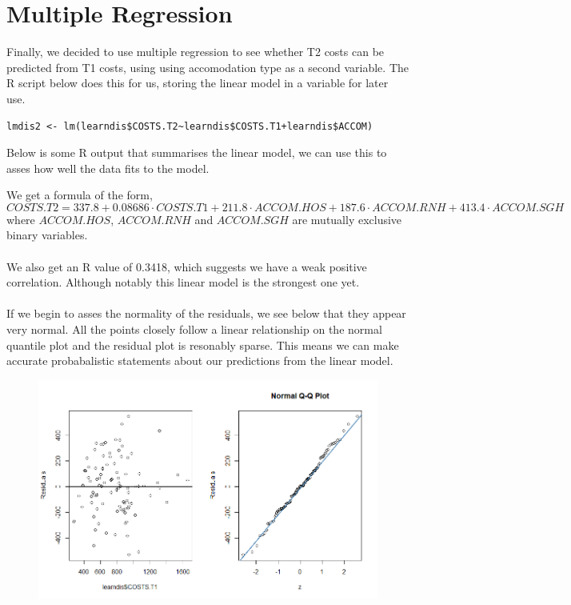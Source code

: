 \documentclass[]{article}
\begin{document}
\section{Multiple Regression}
Finally, we decided to use multiple regression to see whether T2 costs can be predicted from T1 costs, using using accomodation type as a second variable. The R script below does this for us, storing the linear model in a variable for later use.
\begin{lstlisting}
lmdis2 <- lm(learndis$COSTS.T2~learndis$COSTS.T1+learndis$ACCOM)
\end{lstlisting}
Below is some R output that summarises the linear model, we can use this to asses how well the data fits to the model.

We get a formula of the form,
$$COSTS.T2 =  337.8 + 0.08686 \cdot COSTS.T1 + 211.8 \cdot ACCOM.HOS + 187.6 \cdot ACCOM.RNH + 413.4 \cdot ACCOM.SGH$$
where $ACCOM.HOS$, $ACCOM.RNH$ and $ACCOM.SGH$ are mutually exclusive binary variables.
\\
\\
We also get an R value of 0.3418, which suggests we have a weak positive correlation. Although notably this linear model is the strongest one yet.
\\
\\
If we begin to asses the normality of the residuals, we see below that they appear very normal. All the points closely follow a linear relationship on the normal quantile plot and the residual plot is resonably sparse. This means we can make accurate probabalistic statements about our predictions from the linear model.
\begin{figure}[H]
\centering
\includegraphics[width=15cm]{RStudio/jpeg/Mult_Norm.png}
\end{figure}
\end{document}
